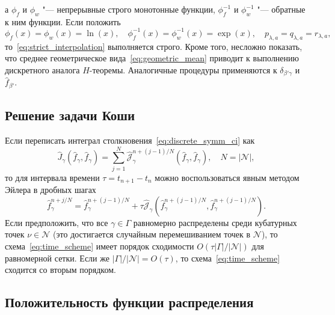 \documentclass[a4paper,12pt]{article}
\newcommand{\Nu}{\mathcal{N}}
\newcommand{\OO}[1]{O(#1)}
\begin{document}
а \(\phi_f\) и \(\phi_w\) "--- непрерывные строго монотонные функции,
\(\phi_f^{-1}\) и \(\phi_w^{-1}\) "--- обратные к ним функции.
Если положить
\begin{equation}\label{eq:geometric_mean}
    \phi_f(x) = \phi_w(x) = \ln(x), \quad \phi_f^{-1}(x) = \phi_w^{-1}(x) = \exp(x), \quad
    p_{\lambda,a} = q_{\lambda,a} = r_{\lambda,a},
\end{equation}
то~\eqref{eq:strict_interpolation} выполняется строго.
Кроме того, несложно показать, что среднее геометрическое вида~\eqref{eq:geometric_mean}
приводит к выполнению дискретного аналога \(H\)-теоремы.
Аналогичные процедуры применяются к \(\delta_{\beta'\gamma}\) и \(\hat{f}_{\beta'}\).

\subsection{Решение задачи Коши}

Если переписать интеграл столкновения~\eqref{eq:discrete_symm_ci} как
\begin{equation}\label{eq:discrete_short_ci}
    \hat{J}_\gamma\left(\hat{f}_\gamma, \hat{f}_\gamma\right) =
    \sum_{j=1}^N \hat{\mathscr{J}}_\gamma^{n+(j-1)/N}
    \left(\hat{f}_\gamma, \hat{f}_\gamma\right), \quad N=|\Nu|,
\end{equation}
то для интервала времени \(\tau = t_{n+1} - t_n\) можно воспользоваться явным методом Эйлера в дробных шагах
\begin{equation}\label{eq:time_scheme}
    \hat{f}_\gamma^{n+j/N} = \hat{f}_\gamma^{n+(j-1)/N} + \tau \hat{\mathscr{J}}_\gamma
    \left(\hat{f}_\gamma^{n+(j-1)/N}, \hat{f}_\gamma^{n+(j-1)/N}\right).
\end{equation}
Если предположить, что все \(\gamma\in\Gamma\) равномерно распределены среди кубатурных точек \(\nu\in\Nu\)
(это достигается случайным перемешиванием точек в \(\Nu\)),
то схема~\eqref{eq:time_scheme} имеет порядок сходимости \(\OO{\tau|\Gamma|/|\Nu|}\) для равномерной сетки.
Если же \(|\Gamma|/|\Nu| = \OO{\tau}\), то схема~\eqref{eq:time_scheme} сходится со вторым порядком.

\subsection{Положительность функции распределения}
\end{document}
